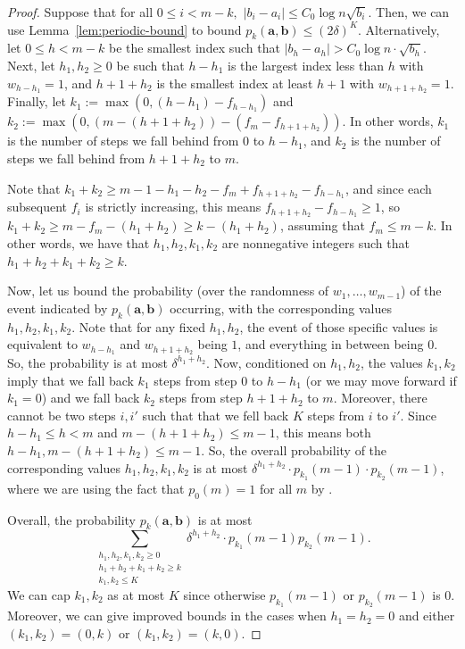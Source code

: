 \documentclass[12pt]{article}
\theoremstyle{definition}
\theoremstyle{remark}
\newcommand{\ba}{\mathbf a}
\newcommand{\bb}{\mathbf b}
\begin{document}
\begin{proof}
    Suppose that for all $0 \le i < m-k,$ $|b_i-a_i| \le C_0 \log n \sqrt{b_i}$. Then, we can use Lemma~\ref{lem:periodic-bound} to bound $p_k(\ba, \bb) \le (2\delta)^{K}$. Alternatively, let $0 \le h < m-k$ be the smallest index such that $|b_h-a_h| > C_0 \log n \cdot \sqrt{b_h}$. Next, let $h_1, h_2 \ge 0$ be such that $h-h_1$ is the largest index less than $h$ with $w_{h-h_1} = 1$, and $h+1+h_2$ is the smallest index at least $h+1$ with $w_{h+1+h_2} = 1$. Finally, let $k_1 := \max(0, (h-h_1) - f_{h-h_1})$ and $k_2 := \max(0, (m-(h+1+h_2)) - (f_m-f_{h+1+h_2}))$. In other words, $k_1$ is the number of steps we fall behind from $0$ to $h-h_1$, and $k_2$ is the number of steps we fall behind from $h+1+h_2$ to $m$.

    Note that $k_1+k_2 \ge m-1-h_1-h_2 - f_m + f_{h+1+h_2}-f_{h-h_1}$, and since each subsequent $f_i$ is strictly increasing, this means $f_{h+1+h_2}-f_{h-h_1} \ge 1$, so $k_1+k_2 \ge m - f_m - (h_1+h_2) \ge k - (h_1+h_2)$, assuming that $f_m \le m-k$. In other words, we have that $h_1, h_2, k_1, k_2$ are nonnegative integers such that $h_1+h_2+k_1+k_2 \ge k$.

    Now, let us bound the probability (over the randomness of $w_1, \dots, w_{m-1}$) of the event indicated by $p_k(\ba, \bb)$ occurring, with the corresponding values $h_1, h_2, k_1, k_2$. Note that for any fixed $h_1, h_2$, the event of those specific values is equivalent to $w_{h-h_1}$ and $w_{h+1+h_2}$ being $1$, and everything in between being $0$. So, the probability is at most $\delta^{h_1+h_2}$. Now, conditioned on $h_1, h_2$, the values $k_1, k_2$ imply that we fall back $k_1$ steps from step $0$ to $h-h_1$ (or we may move forward if $k_1 = 0$) and we fall back $k_2$ steps from step $h+1+h_2$ to $m$. Moreover, there cannot be two steps $i, i'$ such that that we fell back $K$ steps from $i$ to $i'$. Since $h-h_1 \le h < m$ and $m-(h+1+h_2) \le m-1$, this means both $h-h_1, m-(h+1+h_2) \le m-1$. So, the overall probability of the corresponding values $h_1, h_2, k_1, k_2$ is at most $\delta^{h_1+h_2} \cdot p_{k_1}(m-1) \cdot p_{k_2}(m-1)$, where we are using the fact that $p_0(m) = 1$ for all $m$ by .


    Overall, the probability $p_k(\ba, \bb)$ is at most 
\[\sum_{\substack{h_1, h_2, k_1, k_2 \ge 0 \\ h_1+h_2+k_1+k_2 \ge k \\ k_1, k_2 \le K}} \delta^{h_1+h_2} \cdot p_{k_1}(m-1) p_{k_2}(m-1).\]
    We can cap $k_1, k_2$ as at most $K$ since otherwise $p_{k_1}(m-1)$ or $p_{k_2}(m-1)$ is $0$. Moreover, we can give improved bounds in the cases when $h_1 = h_2 = 0$ and either $(k_1, k_2) = (0, k)$ or $(k_1, k_2) = (k, 0)$.


\end{proof}
\end{document}
